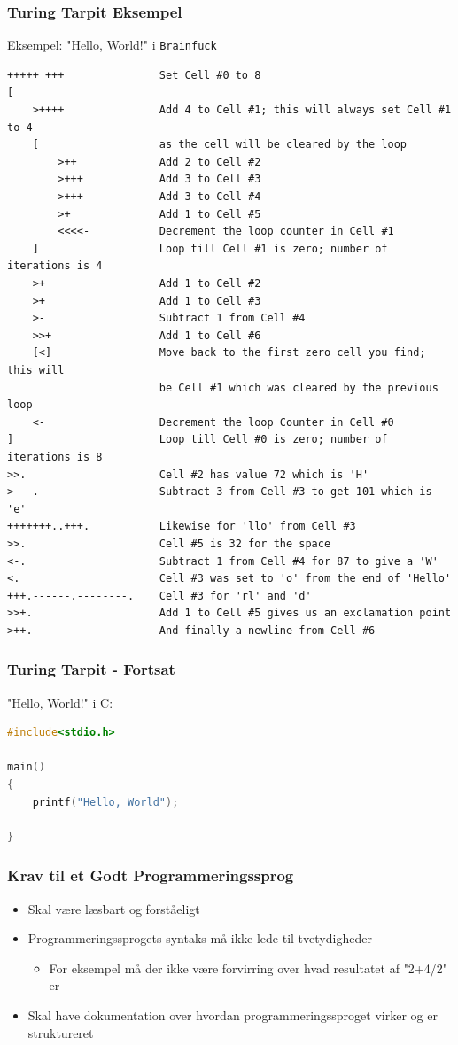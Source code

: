 \documentclass[12pt,t]{beamer}
\begin{document}
\begin{frame}[fragile]
\frametitle{Turing Tarpit Eksempel}
Eksempel: "Hello, World!" i \texttt{Brainfuck}\pause
\begin{lstlisting}[basicstyle=\tiny]
+++++ +++               Set Cell #0 to 8
[
    >++++               Add 4 to Cell #1; this will always set Cell #1 to 4
    [                   as the cell will be cleared by the loop
        >++             Add 2 to Cell #2
        >+++            Add 3 to Cell #3
        >+++            Add 3 to Cell #4
        >+              Add 1 to Cell #5
        <<<<-           Decrement the loop counter in Cell #1
    ]                   Loop till Cell #1 is zero; number of iterations is 4
    >+                  Add 1 to Cell #2
    >+                  Add 1 to Cell #3
    >-                  Subtract 1 from Cell #4
    >>+                 Add 1 to Cell #6
    [<]                 Move back to the first zero cell you find; this will
                        be Cell #1 which was cleared by the previous loop
    <-                  Decrement the loop Counter in Cell #0
]                       Loop till Cell #0 is zero; number of iterations is 8
>>.                     Cell #2 has value 72 which is 'H'
>---.                   Subtract 3 from Cell #3 to get 101 which is 'e'
+++++++..+++.           Likewise for 'llo' from Cell #3
>>.                     Cell #5 is 32 for the space
<-.                     Subtract 1 from Cell #4 for 87 to give a 'W'
<.                      Cell #3 was set to 'o' from the end of 'Hello'
+++.------.--------.    Cell #3 for 'rl' and 'd'
>>+.                    Add 1 to Cell #5 gives us an exclamation point
>++.                    And finally a newline from Cell #6
\end{lstlisting}
\end{frame}

\begin{frame}[fragile]
\frametitle{Turing Tarpit - Fortsat}
"Hello, World!" i C:\pause
\begin{lstlisting}[language=C]
#include<stdio.h>

main()
{
    printf("Hello, World");

}
\end{lstlisting}
\end{frame}

\begin{frame}
 \frametitle{Krav til et Godt Programmeringssprog}
 \begin{block}{}
  \begin{itemize}
  \item Skal være læsbart og forståeligt\\
  \item Programmeringssprogets syntaks må ikke lede til tvetydigheder
  \begin{itemize} 
  \item For eksempel må der ikke være forvirring over hvad resultatet af "2+4/2" er
  \end{itemize}
  \item Skal have dokumentation over hvordan programmeringssproget virker og er 
  struktureret
  \end{itemize}
 \end{block}
\end{frame}
\end{document}
